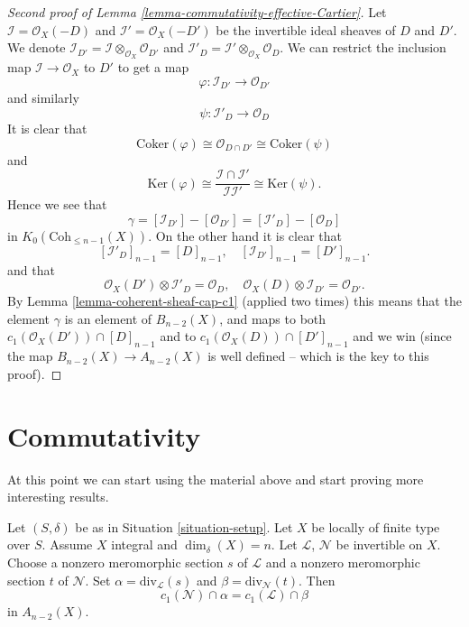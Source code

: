 \begin{proof}[Second proof of Lemma \ref{lemma-commutativity-effective-Cartier}]
Let $\mathcal{I} = \mathcal{O}_X(-D)$ and
$\mathcal{I}' = \mathcal{O}_X(-D')$ be the invertible
ideal sheaves of $D$ and $D'$.
We denote
$\mathcal{I}_{D'} = \mathcal{I} \otimes_{\mathcal{O}_X} \mathcal{O}_{D'}$
and
$\mathcal{I}'_D = \mathcal{I}' \otimes_{\mathcal{O}_X} \mathcal{O}_D$.
We can restrict the inclusion map $\mathcal{I} \to \mathcal{O}_X$
to $D'$ to get a map
$$
\varphi : \mathcal{I}_{D'} \longrightarrow \mathcal{O}_{D'}
$$
and similarly
$$
\psi: \mathcal{I}'_D \longrightarrow \mathcal{O}_D
$$
It is clear that
$$
\text{Coker}(\varphi)
\cong
\mathcal{O}_{D \cap D'}
\cong
\text{Coker}(\psi)
$$
and
$$
\text{Ker}(\varphi)
\cong
\frac{\mathcal{I} \cap \mathcal{I}'}{\mathcal{I}\mathcal{I}'}
\cong
\text{Ker}(\psi).
$$
Hence we see that
$$
\gamma =
[\mathcal{I}_{D'}] - [\mathcal{O}_{D'}]
=
[\mathcal{I}'_D] - [\mathcal{O}_D]
$$
in $K_0(\text{Coh}_{\leq n - 1}(X))$. On the other hand it is clear that
$$
[\mathcal{I}'_D]_{n - 1} = [D]_{n - 1}, \quad
[\mathcal{I}_{D'}]_{n - 1} = [D']_{n - 1}.
$$
and that
$$
\mathcal{O}_X(D') \otimes \mathcal{I}'_D = \mathcal{O}_D, \quad
\mathcal{O}_X(D) \otimes \mathcal{I}_{D'} = \mathcal{O}_{D'}.
$$
By Lemma \ref{lemma-coherent-sheaf-cap-c1} (applied two times)
this means that the element $\gamma$ is an element of $B_{n - 2}(X)$, and
maps to both $c_1(\mathcal{O}_X(D')) \cap [D]_{n - 1}$ and to
$c_1(\mathcal{O}_X(D)) \cap [D']_{n - 1}$ and we win (since the
map $B_{n - 2}(X) \to A_{n - 2}(X)$ is well defined -- which is
the key to this proof).
\end{proof}









\section{Commutativity}
\label{section-commutativity}

\noindent
At this point we can start using the material above and start proving
more interesting results.

\begin{lemma}
\label{lemma-commutativity-on-integral}
Let $(S, \delta)$ be as in Situation \ref{situation-setup}.
Let $X$ be locally of finite type over $S$.
Assume $X$ integral and $\dim_\delta(X) = n$.
Let $\mathcal{L}$, $\mathcal{N}$ be invertible on $X$.
Choose a nonzero meromorphic section $s$ of $\mathcal{L}$
and a nonzero meromorphic section $t$ of $\mathcal{N}$.
Set $\alpha = \text{div}_\mathcal{L}(s)$ and
$\beta = \text{div}_\mathcal{N}(t)$.
Then
$$
c_1(\mathcal{N}) \cap \alpha
=
c_1(\mathcal{L}) \cap \beta
$$
in $A_{n - 2}(X)$.
\end{lemma}

